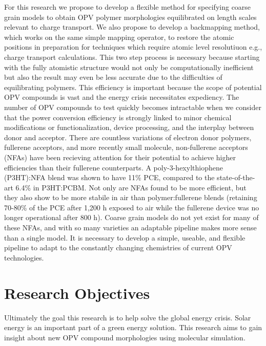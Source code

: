 For this research we propose to develop a flexible method for specifying coarse grain models to obtain OPV polymer morphologies equilibrated on length scales relevant to charge transport.
We also propose to develop a backmapping method, which works on the same simple mapping operator, to restore the atomic positions in preparation for techniques which require atomic level resolutiuon e.g., charge transport calculations.
This two step process is necessary because starting with the fully atomistic structure would not only be computationally inefficient but also the result may even be less accurate due to the difficulties of equilibrating polymers\cite{Gartner2019a}.
This efficiency is important because the scope of potential OPV compounds is vast and the energy crisis necessitates expediency.
The number of OPV compounds to test quickly becomes intractable when we consider that the power conversion efficiency is strongly linked to minor chemical modifications or functionalization, device processing, and the interplay between donor and acceptor\cite{Mazzio2015,Swick2019a}.
There are countless variations of electron donor polymers, fullerene acceptors, and more recently small molecule, non-fullerene acceptors (NFAs) have been recieving attention for their potential to achieve higher efficiencies than their fullerene counterparts\cite{Dou2013}.
A poly-3-hexylthiophene (P3HT):NFA blend was shown to have 11\% PCE, compared to the state-of-the-art 6.4\% in P3HT:PCBM\cite{Baran2017}.
Not only are NFAs found to be more efficient, but they also show to be more stabile in air than polymer:fullerene blends (retaining 70-80\% of the PCE after 1,200 h exposed to air while the fullerene device was no longer operational after 800 h)\cite{Baran2017}.
Coarse grain models do not yet exist for many of these NFAs, and with so many varieties an adaptable pipeline makes more sense than a single model.%
It is necessary to develop a simple, useable, and flexible pipeline to adapt to the constantly changing chemistries of current OPV technologies. %

\section*{Research Objectives}

Ultimately the goal this research is to help solve the global energy crisis. 
Solar energy is an important part of a green energy solution.
This research aims to gain insight about new OPV compound morphologies using molecular simulation.

